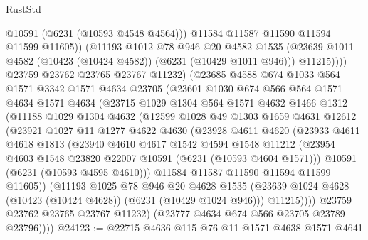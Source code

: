 \begin{lexlean}{RustStd}
\begin{coremodule}
{{                    @10591
                    (@6231 (@10593 @4548 @4564)))
                  @11584
                  @11587
                  @11590
                  @11594
                  @11599
                  @11605))
              (@11193
                @1012
                @78
                @946
                @20
                @4582
                @1535
                (@23639 @1011 @4582 (@10423 (@10424 @4582)) (@6231 (@10429 @1011 @946)))
                @11215))))
        @23759
        @23762
        @23765
        @23767
        @11232)
      (@23685
        @4588
        @674
        @1033
        @564
        @1571
        @3342
        @1571
        @4634
        @23705
        (@23601
          @1030
          @674
          @566
          @564
          @1571
          @4634
          @1571
          @4634
          (@23715
            @1029
            @1304
            @564
            @1571
            @4632
            @1466
            @1312
            (@11188
              @1029
              @1304
              @4632
              (@12599
                @1028
                @49
                @1303
                @1659
                @4631
                @12612
                (@23921
                  @1027
                  @11
                  @1277
                  @4622
                  @4630
                  (@23928
                    @4611
                    @4620
                    (@23933
                      @4611
                      @4618
                      @1813
                      (@23940
                        @4610
                        @4617
                        @1542
                        @4594
                        @1548
                        @11212
                        (@23954 @4603 @1548 @23820 @22007 @10591 (@6231 (@10593 @4604 @1571)))
                        @10591
                        (@6231 (@10593 @4595 @4610)))
                      @11584
                      @11587
                      @11590
                      @11594
                      @11599
                      @11605))
                  (@11193
                    @1025
                    @78
                    @946
                    @20
                    @4628
                    @1535
                    (@23639 @1024 @4628 (@10423 (@10424 @4628)) (@6231 (@10429 @1024 @946)))
                    @11215))))
            @23759
            @23762
            @23765
            @23767
            @11232)
          (@23777 @4634 @674 @566 @23705 @23789 @23796))))
@24123 := @22715 @4636 @115 @76 @11 @1571 @4638 @1571 @4641
}}
\end{coremodule}
\end{lexlean}
